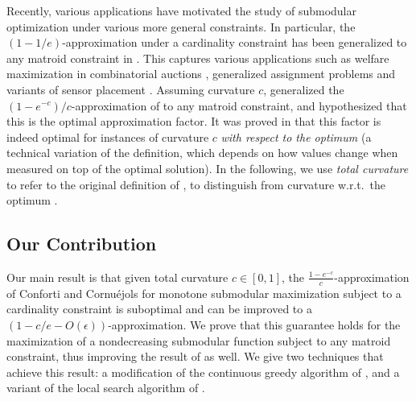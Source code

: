 \documentclass{article}
\theoremstyle{definition}
\begin{document}
Recently, various applications have motivated the study of submodular optimization under various more general constraints. In particular, the $(1-1/e)$-approximation under a cardinality constraint has been generalized to any matroid constraint in \cite{Calinescu2011}. This captures various applications such as welfare maximization in combinatorial auctions \cite{Vondrak2008}, generalized assignment problems \cite{Calinescu2007} and variants of sensor placement \cite{KRGG09}. Assuming curvature $c$, \cite{Vondrak2010} generalized the $(1-e^{-c})/c$-approximation of \cite{Conforti1984} to any matroid constraint, and hypothesized that this is the optimal approximation factor. It was proved in \cite{Vondrak2010} that this factor is indeed optimal for instances of curvature $c$ {\em with respect to the optimum} (a technical variation of the definition, which depends on how values change when measured on top of the optimal solution). 
In the following, we use {\em total curvature} to refer to the original definition of \cite{Conforti1984}, to distinguish from curvature w.r.t.~the optimum \cite{Vondrak2010}.

\subsection{Our Contribution}
\label{sec:our-contribution}

Our main result is that given total curvature $c \in [0,1]$, the $\frac{1-e^{-c}}{c}$-approximation of Conforti and Cornu\'ejols for monotone submodular maximization subject to a cardinality constraint \cite{Conforti1984} is suboptimal and can be improved to a $(1 - c/e - O(\epsilon))$-approximation. We prove that this guarantee holds for the maximization of a nondecreasing submodular function subject to any matroid constraint, thus improving the result of \cite{Vondrak2010} as well. We give two techniques that achieve this result: a modification of the continuous greedy algorithm of \cite{Calinescu2011}, and a variant of the local search algorithm of \cite{Filmus2014}. 
\end{document}
